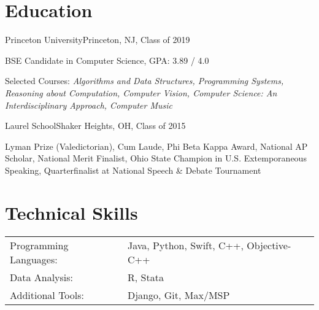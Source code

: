 \documentclass[12pt]{my_resume}
\begin{document}
\vspace{-6pt}

\section{Education}

\begin{resitem}{Princeton University}{Princeton, NJ, Class of 2019}
  \item BSE Candidate in Computer Science, GPA: 3.89 / 4.0
  \item Selected Courses: \textit{Algorithms and Data Structures, %
  Programming Systems, Reasoning about Computation, Computer Vision, %
  Computer Science: An Interdisciplinary Approach, Computer Music}
\end{resitem}

\vspace{-8pt}

\begin{resitem}{Laurel School}{Shaker Heights, OH, Class of 2015}
  \item Lyman Prize (Valedictorian), Cum Laude, Phi Beta Kappa Award, %
  National AP Scholar, National Merit Finalist, Ohio State Champion in %
  U.S. Extemporaneous Speaking, Quarterfinalist at National Speech \& %
  Debate Tournament
\end{resitem}

\section{Technical Skills}

\vspace{-6pt}
\begin{tabular}{l l}%
Programming Languages: & Java, Python, Swift, C++, Objective-C++\\
Data Analysis: & R, Stata\\
Additional Tools: & Django, Git, Max/MSP\\
\end{tabular}

\end{document}
